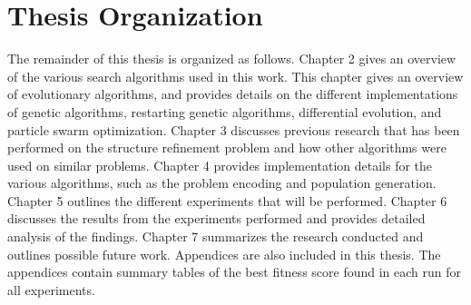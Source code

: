 \section{Thesis Organization}

The remainder of this thesis is organized as follows. Chapter 2 gives an overview of the various search algorithms used in this work. This chapter gives an overview of evolutionary algorithms, and provides details on the different implementations of genetic algorithms, restarting genetic algorithms, differential evolution, and particle swarm optimization. Chapter 3 discusses previous research that has been performed on the structure refinement problem and how other algorithms were used on similar problems. Chapter 4 provides implementation details for the various algorithms, such as the problem encoding and population generation. Chapter 5 outlines the different experiments that will be performed. Chapter 6 discusses the results from the experiments performed and provides detailed analysis of the findings. Chapter 7 summarizes the research conducted and outlines possible future work. Appendices are also included in this thesis. The appendices contain summary tables of the best fitness score found in each run for all experiments.